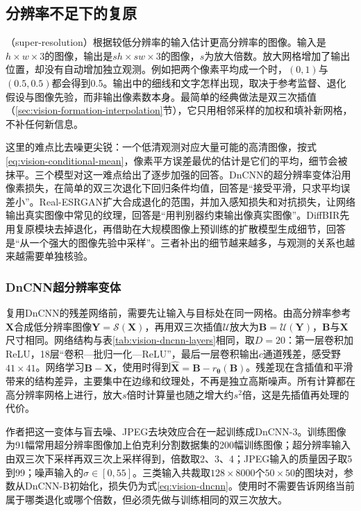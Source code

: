 \subsection{分辨率不足下的复原}
\label{sec:vision-restoration-super-resolution}

（super-resolution）根据较低分辨率的输入估计更高分辨率的图像。输入是$h\times w\times3$的图像，输出是$sh\times sw\times3$的图像，$s$为放大倍数。放大网格增加了输出位置，却没有自动增加独立观测。例如把两个像素平均成一个时，$(0,1)$与$(0.5,0.5)$都会得到0.5。输出中的细线和文字怎样出现，取决于参考监督、退化假设与图像先验，而非输出像素数本身。最简单的经典做法是双三次插值（\ref{sec:vision-formation-interpolation}节），它只用相邻采样的加权和填补新网格，不补任何新信息。

这里的难点比去噪更尖锐：一个低清观测对应大量可能的高清图像，按式\eqref{eq:vision-conditional-mean}，像素平方误差最优的估计是它们的平均，细节会被抹平。三个模型对这一难点给出了逐步加强的回答。DnCNN的超分辨率变体沿用像素损失，在简单的双三次退化下回归条件均值，回答是“接受平滑，只求平均误差小”。Real-ESRGAN扩大合成退化的范围，并加入感知损失和对抗损失，让网络输出真实图像中常见的纹理，回答是“用判别器约束输出像真实图像”。DiffBIR先用复原模块去掉退化，再借助在大规模图像上预训练的扩散模型生成细节，回答是“从一个强大的图像先验中采样”。三者补出的细节越来越多，与观测的关系也越来越需要单独核验。

\subsubsection{DnCNN超分辨率变体}
\label{sec:vision-restoration-dncnn-sr}

复用DnCNN的残差网络前，需要先让输入与目标处在同一网格。由高分辨率参考$\bm{X}$合成低分辨率图像$\bm{Y}=\mathcal{S}(\bm{X})$，再用双三次插值$\mathcal{U}$放大为$\bm{B}=\mathcal{U}(\bm{Y})$，$\bm{B}$与$\bm{X}$尺寸相同。网络结构与表\ref{tab:vision-dncnn-layers}相同，取$D=20$：第一层卷积加ReLU，18层“卷积—批归一化—ReLU”，最后一层卷积输出$c$通道残差，感受野$41\times41$。网络学习$\bm{B}-\bm{X}$，使用时得到$\widehat{\bm{X}}=\bm{B}-r_{\bm{\theta}}(\bm{B})$。残差现在含插值和平滑带来的结构差异，主要集中在边缘和纹理处，不再是独立高斯噪声。所有计算都在高分辨率网格上进行，放大$s$倍时计算量也随之增大约$s^2$倍，这是先插值再处理的代价。

作者把这一变体与盲去噪、JPEG去块效应合在一起训练成DnCNN-3。训练图像为91幅常用超分辨率图像加上伯克利分割数据集的200幅训练图像；超分辨率输入由双三次下采样再双三次上采样得到，倍数取2、3、4；JPEG输入的质量因子取5到99；噪声输入的$\sigma\in[0,55]$。三类输入共裁取$128\times8000$个$50\times50$的图块对，参数从DnCNN-B初始化，损失仍为式\eqref{eq:vision-dncnn}。使用时不需要告诉网络当前属于哪类退化或哪个倍数，但必须先做与训练相同的双三次放大。

